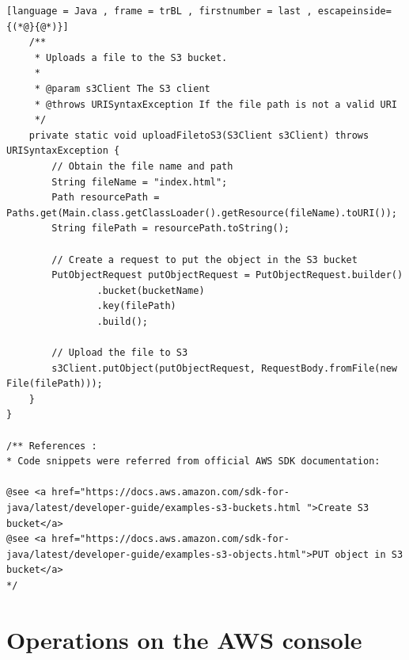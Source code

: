 \begin{itemize}
\begin{lstlisting}[language = Java , frame = trBL , firstnumber = last , escapeinside={(*@}{@*)}]
    /**
     * Uploads a file to the S3 bucket.
     *
     * @param s3Client The S3 client
     * @throws URISyntaxException If the file path is not a valid URI
     */
    private static void uploadFiletoS3(S3Client s3Client) throws URISyntaxException {
        // Obtain the file name and path
        String fileName = "index.html";
        Path resourcePath = Paths.get(Main.class.getClassLoader().getResource(fileName).toURI());
        String filePath = resourcePath.toString();

        // Create a request to put the object in the S3 bucket
        PutObjectRequest putObjectRequest = PutObjectRequest.builder()
                .bucket(bucketName)
                .key(filePath)
                .build();

        // Upload the file to S3
        s3Client.putObject(putObjectRequest, RequestBody.fromFile(new File(filePath)));
    }
}

/** References : 
* Code snippets were referred from official AWS SDK documentation:

@see <a href="https://docs.aws.amazon.com/sdk-for-java/latest/developer-guide/examples-s3-buckets.html ">Create S3 bucket</a>
@see <a href="https://docs.aws.amazon.com/sdk-for-java/latest/developer-guide/examples-s3-objects.html">PUT object in S3 bucket</a>
*/
\end{lstlisting}
    
\end{itemize}

\section{Operations on the AWS console}

